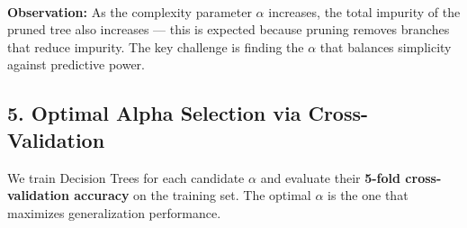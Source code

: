 \documentclass[11pt]{article}
\begin{document}
    \begin{center}
    \end{center}
    { \hspace*{\fill} \\}
    
    \textbf{Observation:} As the complexity parameter \(\alpha\) increases,
the total impurity of the pruned tree also increases --- this is
expected because pruning removes branches that reduce impurity. The key
challenge is finding the \(\alpha\) that balances simplicity against
predictive power.

    \subsection{5. Optimal Alpha Selection via
Cross-Validation}\label{optimal-alpha-selection-via-cross-validation}

We train Decision Trees for each candidate \(\alpha\) and evaluate their
\textbf{5-fold cross-validation accuracy} on the training set. The
optimal \(\alpha\) is the one that maximizes generalization performance.
\end{document}
